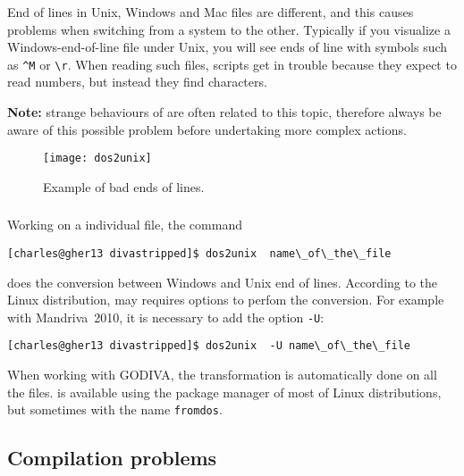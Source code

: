 End of lines in Unix,  Windows and Mac files are different, and this causes problems when switching from a system to the other. Typically if you visualize a Windows-end-of-line file under Unix, you will see ends of line with symbols such as \verb|^M| or \verb|\r|. When reading such files, scripts get in trouble because they expect to read numbers, but instead they find characters.

\textbf{Note:} strange behaviours of \diva are often related to this topic, therefore always be aware of this possible problem before undertaking more complex actions.

\begin{figure}[htpb]
\centering
\texttt{[image: dos2unix]}
\caption{Example of bad ends of lines.\label{fig:error_dos2unix2}}
\end{figure}


\subsubsection{\answer}

Working on a individual file, the command\\

\begin{lstlisting}[style=Bash]
[charles@gher13 divastripped]$ dos2unix  name\_of\_the\_file
\end{lstlisting}
does the conversion between Windows and Unix end of lines. According to the Linux distribution,  may requires options to perfom the conversion. For example with Mandriva~2010, it is necessary to add the option \texttt{-U}:

\begin{lstlisting}[style=Bash]
[charles@gher13 divastripped]$ dos2unix  -U name\_of\_the\_file
\end{lstlisting}

When working with GODIVA, the transformation is automatically done on all the files.  is available using the package manager of most of Linux distributions, but sometimes with the name \texttt{fromdos}.


\subsection{Compilation problems\label{sec:error_compile}}

